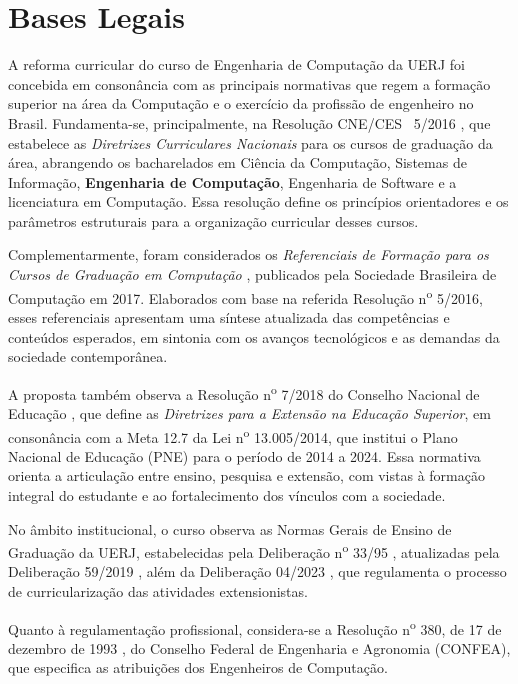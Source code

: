 \chapter{Bases Legais}
\thispagestyle{plain}

A reforma curricular do curso de Engenharia de Computação da UERJ foi concebida em consonância com as principais normativas que regem a formação superior na área da Computação e o exercício da profissão de engenheiro no Brasil. Fundamenta-se, principalmente, na Resolução CNE/CES ~5/2016 \cite{cne2016}, que estabelece as \textit{Diretrizes Curriculares Nacionais} para os cursos de graduação da área, abrangendo os bacharelados em Ciência da Computação, Sistemas de Informação, \textbf{Engenharia de Computação}, Engenharia de Software e a licenciatura em Computação. Essa resolução define os princípios orientadores e os parâmetros estruturais para a organização curricular desses cursos.

Complementarmente, foram considerados os \textit{Referenciais de Formação para os Cursos de Graduação em Computação} \cite{sbc2017}, publicados pela Sociedade Brasileira de Computação em 2017. Elaborados com base na referida Resolução n\textsuperscript{o}  5/2016, esses referenciais apresentam uma síntese atualizada das competências e conteúdos esperados, em sintonia com os avanços tecnológicos e as demandas da sociedade contemporânea.

A proposta também observa a Resolução n\textsuperscript{o} 7/2018 do Conselho Nacional de Educação \cite{cne2018}, que define as \textit{Diretrizes para a Extensão na Educação Superior}, em consonância com a Meta 12.7 da Lei n\textsuperscript{o} 13.005/2014, que institui o Plano Nacional de Educação (PNE) para o período de 2014 a 2024. Essa normativa orienta a articulação entre ensino, pesquisa e extensão, com vistas à formação integral do estudante e ao fortalecimento dos vínculos com a sociedade.

No âmbito institucional, o curso observa as Normas Gerais de Ensino de Graduação da UERJ, estabelecidas pela Deliberação n\textsuperscript{o} 33/95 \cite{uerj1995}, atualizadas pela Deliberação  59/2019 \cite{uerj2019}, além da Deliberação  04/2023 \cite{uerj2023}, que regulamenta o processo de curricularização das atividades extensionistas.

Quanto à regulamentação profissional, considera-se a Resolução n\textsuperscript{o} 380, de 17 de dezembro de 1993 \cite{confea1993}, do Conselho Federal de Engenharia e Agronomia (CONFEA), que especifica as atribuições dos Engenheiros de Computação.

